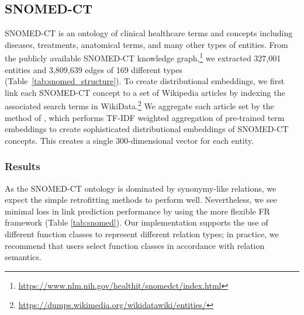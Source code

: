 \documentclass[11pt, a4paper]{article}
\begin{document}
\subsection{SNOMED-CT}
\label{sec:snomed}
SNOMED-CT is an ontology of clinical healthcare terms and concepts including diseases, treatments, anatomical terms, and many other types of entities. From the publicly available SNOMED-CT knowledge graph,\footnote{\url{https://www.nlm.nih.gov/healthit/snomedct/index.html}} we extracted 327,001 entities and 3,809,639 edges of 169 different types (Table~\ref{tab:snomed_structure}). %
To create distributional embeddings, we first link each SNOMED-CT concept to a set of Wikipedia articles by indexing the associated search terms in WikiData.\footnote{\url{https://dumps.wikimedia.org/wikidatawiki/entities/}} We aggregate each article set by the method of , which performs TF-IDF weighted aggregation of pre-trained term embeddings to create sophisticated distributional embeddings of SNOMED-CT concepts. This creates a single 300-dimensional vector for each entity.

\subsubsection*{Results}
As the SNOMED-CT ontology is dominated by synonymy-like relations, we expect the simple retrofitting methods to perform well. Nevertheless, we see minimal loss in link prediction performance by using the more flexible FR framework (Table \ref{tab:snomed}). Our implementation supports the use of different function classes to represent different relation types; in practice, we recommend that users select function classes in accordance with relation semantics.
\end{document}
